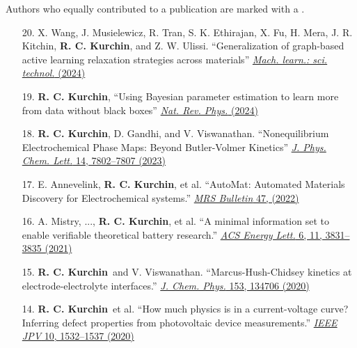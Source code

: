 Authors who equally contributed to a publication are marked with a \textdagger.

\newcommand{\myname}{\textbf{R. C. Kurchin}}

\begin{enumerate}
        \item[20.] X. Wang, J. Musielewicz, R. Tran, S. K. Ethirajan, X. Fu, H. Mera, J. R. Kitchin, \myname, and Z. W. Ulissi. ``Generalization of graph-based active learning relaxation strategies across materials'' \href{https://iopscience.iop.org/article/10.1088/2632-2153/ad37f0}{\textit{Mach. learn.: sci. technol.} (2024)}

        \item[19.] \myname, ``Using Bayesian parameter estimation to learn more from data without black boxes'' \href{https://www.nature.com/articles/s42254-024-00698-0}{\textit{Nat. Rev. Phys.} (2024)}

        \item[18.] \myname, D. Gandhi, and V. Viswanathan. ``Nonequilibrium Electrochemical Phase Maps: Beyond Butler-Volmer Kinetics'' \href{https://pubs.acs.org/doi/10.1021/acs.jpclett.3c01992}{\textit{J. Phys. Chem. Lett.} 14, 7802--7807 (2023)}

        \item[17.] E. Annevelink\ec, \myname\ec, et al. ``AutoMat: Automated Materials Discovery for Electrochemical systems.'' \href{https://doi.org/10.1557/s43577-022-00424-0}{\textit{MRS Bulletin} 47, (2022)}

        \item[16.] A. Mistry, ..., \myname, et al. ``A minimal information set to enable verifiable theoretical battery research.'' \href{https://pubs.acs.org/doi/10.1021/acsenergylett.1c01710}{\textit{ACS Energy Lett.} 6, 11, 3831--3835 (2021)}

        \item[15.] \myname~and V. Viswanathan. ``Marcus-Hush-Chidsey kinetics at electrode-electrolyte interfaces.'' \href{https://aip.scitation.org/doi/10.1063/5.0023611}{\textit{J. Chem. Phys.} 153, 134706 (2020)}

        \item[14.] \myname~et al. ``How much physics is in a current-voltage curve? Inferring defect properties from photovoltaic device measurements.'' \href{https://ieeexplore.ieee.org/document/9157971}{\textit{IEEE JPV} 10, 1532--1537 (2020)}


\end{enumerate}
